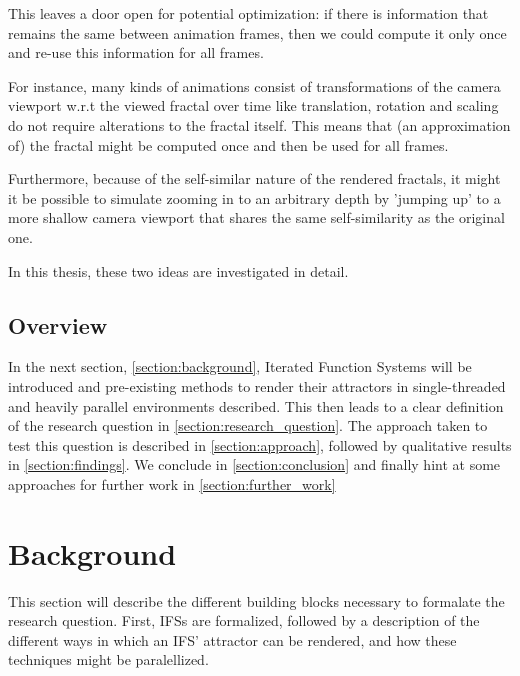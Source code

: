 \documentclass[11pt]{article}
\begin{document}
This leaves a door open for potential optimization: if there is information that remains the same between animation frames, 
then we could compute it only once and re-use this information for all frames.

For instance, many kinds of animations consist of transformations of the camera viewport w.r.t the viewed fractal over time like translation, rotation and scaling do not require alterations to the fractal itself.
This means that (an approximation of) the fractal might be computed once and then be used for all frames.

Furthermore, because of the self-similar nature of the rendered fractals,
it might it be possible to simulate zooming in to an arbitrary depth by 'jumping up' to a more shallow camera viewport
that shares the same self-similarity as the original one.

In this thesis, these two ideas are investigated in detail.

\subsection{Overview}
\label{sec:orgc42c656}

In the next section, \autoref{section:background}, Iterated Function Systems will be introduced and pre-existing methods to render their attractors in single-threaded and heavily parallel environments described.
This then leads to a clear definition of the research question in \autoref{section:research_question}.
The approach taken to test this question is described in \autoref{section:approach}, followed by qualitative results in \autoref{section:findings}.
We conclude in \autoref{section:conclusion} and finally hint at some approaches for further work in \autoref{section:further_work}


\section{Background}
\label{sec:orga9c5e61}
\label{section:background}

This section will describe the different building blocks necessary to formalate the research question.
First, IFSs are formalized, followed by a description of the different ways in which an IFS' attractor can be rendered, 
and how these techniques might be paralellized.

\pagebreak
\end{document}
